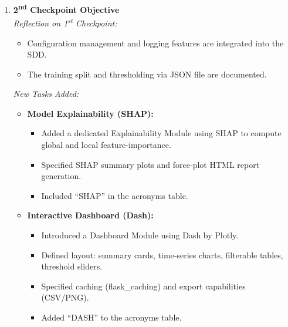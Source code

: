 \documentclass[12pt]{article}
\begin{document}
\begin{enumerate}[label=\textbf{\arabic*.}]
  \item \textbf{2\textsuperscript{nd} Checkpoint Objective}\\
    \emph{Reflection on 1\textsuperscript{st} Checkpoint:}  
    \begin{itemize}
      \item Configuration management and logging features are integrated into the SDD.
      \item The training split and thresholding via JSON file are documented.
    \end{itemize}
    \emph{New Tasks Added:}
    \begin{itemize}
      \item \textbf{Model Explainability (SHAP):}
        \begin{itemize}
          \item Added a dedicated Explainability Module using SHAP to compute global and local feature‐importance.
          \item Specified SHAP summary plots and force‐plot HTML report generation.
          \item Included “SHAP” in the acronyms table.
        \end{itemize}
      \item \textbf{Interactive Dashboard (Dash):}
        \begin{itemize}
          \item Introduced a Dashboard Module using Dash by Plotly.
          \item Defined layout: summary cards, time‐series charts, filterable tables, threshold sliders.
          \item Specified caching (flask\_caching) and export capabilities (CSV/PNG).
          \item Added “DASH” to the acronyms table.
        \end{itemize}
    \end{itemize}


\end{enumerate}
\end{document}
